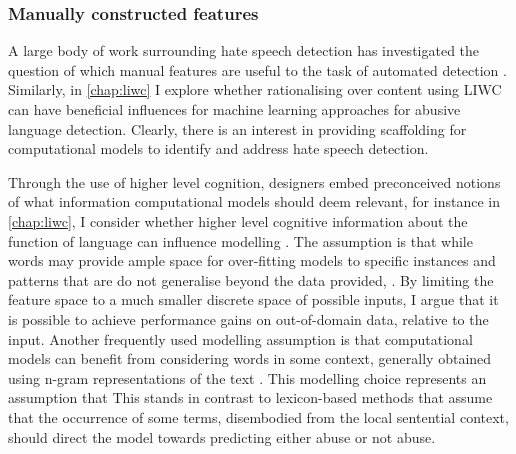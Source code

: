 \subsubsection{Manually constructed features}
A large body of work surrounding hate speech detection has investigated the question of which manual features are useful to the task of automated detection \citep{Waseem:2016,Chiril:2019,Fortuna:2018,Stankovic:2020}.
Similarly, in \autoref{chap:liwc} I explore whether rationalising over content using LIWC can have beneficial influences for machine learning approaches for abusive language detection.
Clearly, there is an interest in providing scaffolding for computational models to identify and address hate speech detection.

Through the use of higher level cognition, designers embed preconceived notions of what information computational models should deem relevant, for instance in \autoref{chap:liwc}, I consider whether higher level cognitive information about the function of language can influence modelling .
The assumption is that while words may provide ample space for over-fitting models to specific instances and patterns that are do not generalise beyond the data provided, .
By limiting the feature space to a much smaller discrete space of possible inputs, I argue that it is possible to achieve performance gains on out-of-domain data, relative to the input.
Another frequently used modelling assumption is that computational models can benefit from considering words in some context, generally obtained using n-gram representations of the text \citep{Waseem-Hovy:2016,Davidson:2017,Chiril:2019}.
This modelling choice represents an assumption that 
This stands in contrast to lexicon-based methods \citep{Hurtlex:2019} that assume that the occurrence of some terms, disembodied from the local sentential context, should direct the model towards predicting either abuse or not abuse.

